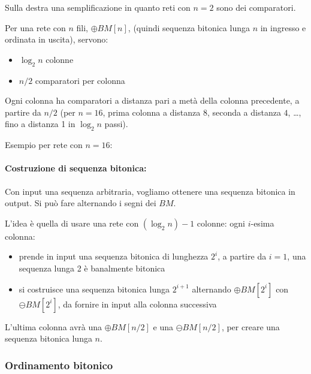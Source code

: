 %     
%     

Sulla destra una semplificazione in quanto reti con $n = 2$ sono dei comparatori.

Per una rete con $n$ fili, $\oplus BM [n]$, (quindi sequenza bitonica lunga $n$ in ingresso e ordinata in uscita), servono: 
\begin{itemize}
    \item $\log_2 n$ colonne
    
    \item $n/2$ comparatori per colonna
\end{itemize}

Ogni colonna ha comparatori a distanza pari a metà della colonna precedente, a partire da $n/2$ (per $n=16$, prima colonna a distanza $8$, seconda a distanza $4$, \dots, fino a distanza 1 in $\log_2 n$ passi). 

Esempio per rete con $n = 16$:

\paragraph{Costruzione di sequenza bitonica:} Con input una sequenza arbitraria, vogliamo ottenere una sequenza bitonica in output. Si può fare alternando i segni dei $BM$.

L'idea è quella di usare una rete con $(\log_2 n) - 1$ colonne: ogni $i$-esima colonna:
\begin{itemize}
    \item prende in input una sequenza bitonica di lunghezza $2^i$, a partire da $i=1$, una sequenza lunga 2 è banalmente bitonica
    
    \item si costruisce una sequenza bitonica lunga $2^{i+1}$ alternando $\oplus BM[2^i]$ con $\ominus BM[2^i]$, da fornire in input alla colonna successiva
\end{itemize}

L'ultima colonna avrà una $\oplus BM [n/2]$ e una $\ominus BM [n/2]$, per creare una sequenza bitonica lunga $n$.

\subsubsection{Ordinamento bitonico}

